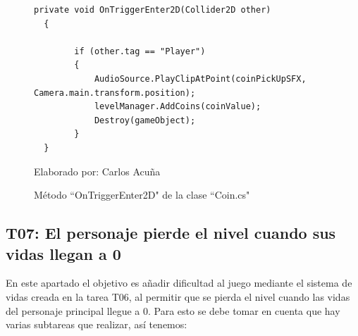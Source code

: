 \documentclass[a4paper, openright, 12pt]{report}
\begin{document}
\begin{itemize}
\begin{figure}[h]
\captionsetup{justification=centering,margin=2cm}
\centering
\lstset{language=C, breaklines=true, basicstyle=\footnotesize}
\lstset{numbers=left, numberstyle=\tiny, stepnumber=1, numbersep=-2pt}
\captionsetup{justification=centering,margin=2cm}
\begin{lstlisting}[frame=single]
  private void OnTriggerEnter2D(Collider2D other)
  {

        if (other.tag == "Player")
        {
            AudioSource.PlayClipAtPoint(coinPickUpSFX, Camera.main.transform.position);
            levelManager.AddCoins(coinValue);
            Destroy(gameObject);
        }
  }
\end{lstlisting}
\caption{Método ``OnTriggerEnter2D" de la clase ``Coin.cs"}
Elaborado por: Carlos Acuña
\end{figure}

\end{itemize}

\subsection*{T07: El personaje pierde el nivel cuando sus vidas llegan a 0}
\justify
En este apartado el objetivo es añadir dificultad al juego mediante el sistema de vidas creada en la tarea T06, al permitir que se pierda el nivel cuando las vidas del personaje principal llegue a 0. Para esto se debe tomar en cuenta que hay varias subtareas que realizar, así tenemos:
\end{document}
